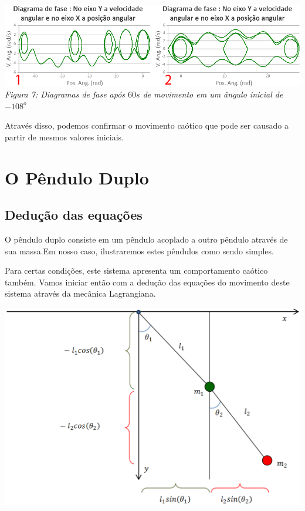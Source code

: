 \documentclass[13pt,a4paper]{report}
\begin{document}
\begin{center}
\includegraphics[scale=0.5]{figuras/figura7.png}
\\
\textit{Figura 7: Diagramas de fase  após $60 s$ de movimento em um ângulo inicial de $-108^{\underline{o}}$ }
\end{center}

Através disso, podemos confirmar o movimento caótico que pode ser causado a partir de mesmos valores iniciais.
\clearpage

\chapter{O Pêndulo Duplo}	
\section{Dedução das equações}

O pêndulo duplo consiste em um pêndulo acoplado a outro pêndulo através de sua massa.Em nosso caso, ilustraremos estes pêndulos como sendo simples.

Para certas condições, este sistema apresenta um comportamento caótico também. Vamos iniciar então com a dedução das equações do movimento deste sistema através da mecânica Lagrangiana.

\begin{center}
\includegraphics[scale=0.4]{figuras/esquemapenduloduplo.png}
\end{center}
\clearpage
\end{document}
